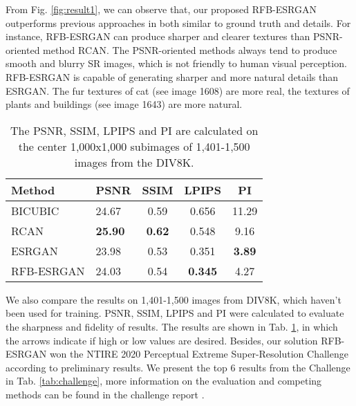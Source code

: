 \documentclass[10pt,twocolumn,letterpaper]{article}
\begin{document}
From Fig. \ref{fig:result1}, we can observe that, our proposed RFB-ESRGAN outperforms previous approaches in both similar to ground truth and details. For instance, RFB-ESRGAN can produce sharper and clearer textures than PSNR-oriented method RCAN. The PSNR-oriented methods always tend to produce smooth and blurry SR images, which is not friendly to human visual perception. RFB-ESRGAN is capable of generating sharper and more natural details than ESRGAN. The fur textures of cat (see image 1608) are more real, the textures of plants and buildings (see image 1643) are more natural.

\begin{table}[htbp]
\centering
\begin{tabular}{llccc}
\hline \hline
\multicolumn{1}{l|}{Method}          & PSNR    & SSIM     & LPIPS   & PI   \\ \hline
\multicolumn{1}{l|}{BICUBIC}      & 24.67  & 0.59  & 0.656  & 11.29 \\
\multicolumn{1}{l|}{RCAN}        & \textbf{25.90}  & \textbf{0.62}  & 0.548  & 9.16 \\
\multicolumn{1}{l|}{ESRGAN}   & 23.98  & 0.53  & 0.351  & \textbf{3.89} \\
\multicolumn{1}{l|}{RFB-ESRGAN}  & 24.03  & 0.54  & \textbf{0.345}  & 4.27  \\
\hline\hline
\end{tabular}
\caption{The PSNR, SSIM, LPIPS and PI are calculated on the center 1,000x1,000 subimages of 1,401-1,500 images from the DIV8K.}
\label{tab:validation1}
\end{table}

We also compare the results on 1,401-1,500 images from DIV8K, which haven't been used for training. PSNR, SSIM, LPIPS and PI were calculated to evaluate the sharpness and fidelity of results. The results are shown in Tab. \ref{tab:validation1}, in which the arrows indicate if high  or low  values are desired. Besides, our solution RFB-ESRGAN won the NTIRE 2020 Perceptual Extreme Super-Resolution Challenge according to preliminary results. We present the top 6 results from the Challenge in Tab. \ref{tab:challenge}, more information on the evaluation and competing methods can be found in the challenge report \cite{zhang2020ntire}.
\end{document}
